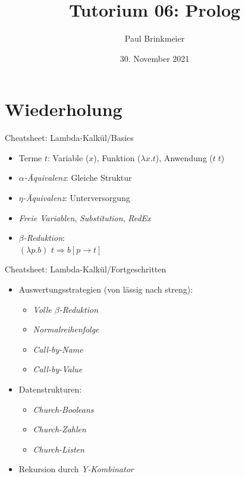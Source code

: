 \documentclass{beamer}
\title{Tutorium 06: Prolog}
\author{Paul Brinkmeier}
\institute{Tutorium Programmierparadigmen am KIT}
\date{30. November 2021}
\begin{document}
\begin{frame}
	\titlepage
\end{frame}

\section{Wiederholung}

\begin{frame}{Cheatsheet: Lambda-Kalkül/Basics}
  \begin{itemize}
    \item Terme $t$: Variable ($x$), Funktion ($\lambda x . t$), Anwendung ($t \; t$)
    \item \emph{$\alpha$-Äquivalenz}: Gleiche Struktur
    \item \emph{$\eta$-Äquivalenz}: Unterversorgung
    \item \emph{Freie Variablen}, \emph{Substitution}, \emph{RedEx}
    \item \emph{$\beta$-Reduktion}: \\
          $(\lambda{}p.b)$ $t \Rightarrow b\left[p\rightarrow{}t\right]$
  \end{itemize}
\end{frame}


\begin{frame}{Cheatsheet: Lambda-Kalkül/Fortgeschritten}
  \begin{itemize}
    \item Auswertungsstrategien (von lässig nach streng):
    \begin{itemize}
      \item \emph{Volle $\beta$-Reduktion}
      \item \emph{Normalreihenfolge}
      \item \emph{Call-by-Name}
      \item \emph{Call-by-Value}
    \end{itemize}
    \item Datenstrukturen:
    \begin{itemize}
      \item \emph{Church-Booleans}
      \item \emph{Church-Zahlen}
      \item \emph{Church-Listen}
    \end{itemize}
    \item Rekursion durch \emph{Y-Kombinator}
  \end{itemize}
\end{frame}
\end{document}
